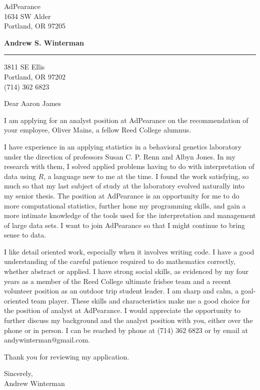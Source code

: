 \documentclass[11pt]{letter} %
\begin{document}
\longindentation=0pt                       %
\let\raggedleft\raggedright                %
 
\begin{letter}{
AdPearance \\
1634 SW Alder \\
Portland, OR 97205 \\
 }
 
\begin{center}
\large \bf{Andrew S. Winterman} \end{center}
\medskip\hrule height 1pt
\begin{center}
3811 SE Ellis \\ Portland, OR 97202 \\ (714) 362 6823
\end{center}  



\opening{Dear Aaron James} 
 
 I am applying for an analyst position at AdPearance on the recommendation of  your employee, Oliver Mains, a fellow Reed College alumnus.
 
I have experience in an applying statistics in a behavioral genetics laboratory under the direction of professors Susan C. P. Renn and Albyn Jones. In my research with them, I solved applied problems having to do with interpretation of data using $R$, a language new to me at the time. I found the work satisfying, so much so that my last subject of study at the laboratory evolved naturally into my senior thesis. The position at AdPearance is an opportunity for me to do more computational statistics, further hone my programming skills, and gain a more intimate knowledge of the tools used for the interpretation and management of large data sets. I want to join AdPearance so that I might continue to bring sense to data. 
 
 I like detail oriented work, especially when it involves writing code. I have a good understanding of the careful patience required to do mathematics correctly, whether abstract or applied. I have strong social skills, as evidenced by my four years as a member of the Reed College ultimate frisbee team and a recent volunteer position as an outdoor trip student leader. I am sharp and calm, a goal-oriented team player. These skills and characteristics make me a good choice for the position of analyst at AdPearance. I would appreciate the opportunity to further discuss my background and the analyst position with you, either over the phone or in person.  I can be reached by phone at (714) 362 6823 or by email at andywinterman@gmail.com. 

Thank you for reviewing my application.

Sincerely, \\
Andrew Winterman

\end{letter}
 
\end{document}
